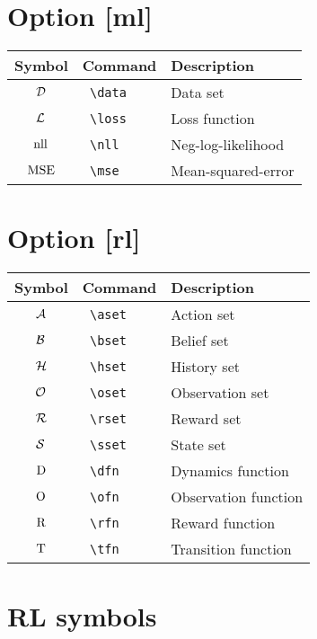 \documentclass{article}
\begin{document}
\section*{Option [ml]}

\begin{tabular}{cll}
  Symbol & Command & Description \\
  \hline
  ${\mathcal{D}}$ & \texttt{ \textbackslash data } & Data set \\
  $\mathcal{L}$ & \texttt{ \textbackslash loss } & Loss function \\
  ${\operatorname{nll}}$ & \texttt{ \textbackslash nll } & Neg-log-likelihood \\
  ${\operatorname{MSE}}$ & \texttt{ \textbackslash mse } & Mean-squared-error \\
\end{tabular}

\section*{Option [rl]}

\begin{tabular}{cll}
  Symbol & Command & Description \\
  \hline
  $\mathcal{A}$ & \texttt{ \textbackslash aset } & Action set \\
  $\mathcal{B}$ & \texttt{ \textbackslash bset } & Belief set \\
  $\mathcal{H}$ & \texttt{ \textbackslash hset } & History set \\
  $\mathcal{O}$ & \texttt{ \textbackslash oset } & Observation set \\
  $\mathcal{R}$ & \texttt{ \textbackslash rset } & Reward set \\
  $\mathcal{S}$ & \texttt{ \textbackslash sset } & State set \\
  $\mathrm{D}$ & \texttt{ \textbackslash dfn } & Dynamics function \\
  $\mathrm{O}$ & \texttt{ \textbackslash ofn } & Observation function \\
  $\mathrm{R}$ & \texttt{ \textbackslash rfn } & Reward function \\
  $\mathrm{T}$ & \texttt{ \textbackslash tfn } & Transition function \\
\end{tabular}

\section{RL symbols}
\end{document}
